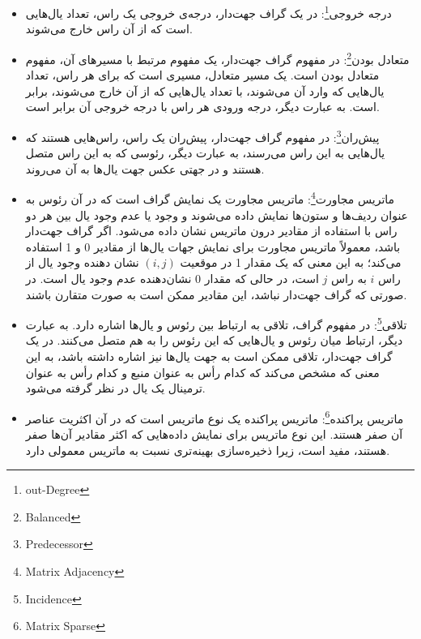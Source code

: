 \documentclass[a4paper,10pt]{article}
\begin{document}
\begin{itemize}
        \item درجه خروجی\footnote{\hspace{2pt}out-Degree}: در یک گراف جهت‌دار، درجه‌ی خروجی یک راس، تعداد یال‌هایی است که از آن راس خارج می‌شوند.

        \item متعادل بودن\footnote{\hspace{2pt}Balanced}: در مفهوم گراف جهت‌دار، یک مفهوم مرتبط با مسیرهای آن، مفهوم متعادل بودن است. یک مسیر متعادل، مسیری است که برای هر راس، تعداد یال‌هایی که وارد آن می‌شوند، با تعداد یال‌هایی که از آن خارج می‌شوند، برابر است. به عبارت دیگر، درجه ورودی هر راس با درجه خروجی آن برابر است.
        
        \item پیش‌ران\footnote{\hspace{2pt}Predecessor}: در مفهوم گراف جهت‌دار، پیش‌ران یک راس، راس‌هایی هستند که یال‌هایی به این راس می‌رسند، به عبارت دیگر، رئوسی که به این راس متصل هستند و در جهتی عکس جهت یال‌ها به آن می‌روند.

        \item ماتریس مجاورت\footnote{\hspace{2pt}Matrix Adjacency}: ماتریس مجاورت یک نمایش گراف است که در آن رئوس به عنوان ردیف‌ها و ستون‌ها نمایش داده می‌شوند و وجود یا عدم وجود یال بین هر دو راس با استفاده از مقادیر درون ماتریس نشان داده می‌شود. اگر گراف جهت‌دار باشد، معمولاً ماتریس مجاورت برای نمایش جهات یال‌ها از مقادیر 0 و 1 استفاده می‌کند؛ به این معنی که یک مقدار 1 در موقعیت $(i, j)$ نشان دهنده وجود یال از راس $i$ به راس $j$ است، در حالی که مقدار 0 نشان‌دهنده عدم وجود یال است. در صورتی که گراف جهت‌دار نباشد، این مقادیر ممکن است به صورت متقارن باشند.
        
        \item تلاقی\footnote{\hspace{2pt}Incidence}: در مفهوم گراف، تلاقی به ارتباط بین رئوس و یال‌ها اشاره دارد. به عبارت دیگر، ارتباط میان رئوس و یال‌هایی که این رئوس را به هم متصل می‌کنند. در یک گراف جهت‌دار، تلاقی ممکن است به جهت یال‌ها نیز اشاره داشته باشد، به این معنی که مشخص می‌کند که کدام رأس به عنوان منبع و کدام رأس به عنوان ترمینال یک یال در نظر گرفته می‌شود.
        
        \item ماتریس پراکنده\footnote{\hspace{2pt}Matrix Sparse}: ماتریس پراکنده یک نوع ماتریس است که در آن اکثریت عناصر آن صفر هستند. این نوع ماتریس برای نمایش داده‌هایی که اکثر مقادیر آن‌ها صفر هستند، مفید است، زیرا ذخیره‌سازی بهینه‌تری نسبت به ماتریس معمولی دارد.
        

\end{itemize}
\end{document}
